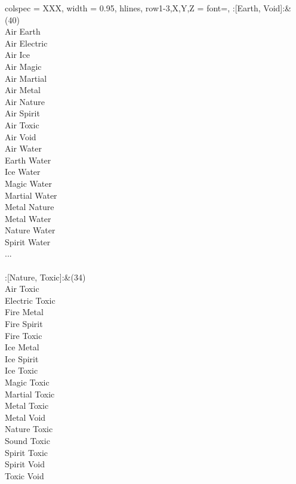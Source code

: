 \begin{longtblr}[
	caption = {2v2 Defending Resisted},
	label = {2v2-Defending-Resisted},
]{
	colspec = {XXX}, width = 0.95\linewidth,
	hlines,
	row{1-3,X,Y,Z} = {font=\bfseries},
}
	:[Earth, Void]:&{(40)\\
	Air Earth \\
	Air Electric \\
	Air Ice \\
	Air Magic \\
	Air Martial \\
	Air Metal \\
	Air Nature \\
	Air Spirit \\
	Air Toxic \\
	Air Void \\
	Air Water \\
	Earth Water \\
	Ice Water \\
	Magic Water \\
	Martial Water \\
	Metal Nature \\
	Metal Water \\
	Nature Water \\
	Spirit Water \\
	...\\
	}\\

	:[Nature, Toxic]:&{(34)\\
	Air Toxic \\
	Electric Toxic \\
	Fire Metal \\
	Fire Spirit \\
	Fire Toxic \\
	Ice Metal \\
	Ice Spirit \\
	Ice Toxic \\
	Magic Toxic \\
	Martial Toxic \\
	Metal Toxic \\
	Metal Void \\
	Nature Toxic \\
	Sound Toxic \\
	Spirit Toxic \\
	Spirit Void \\
	Toxic Void \\
	}\\


\end{longtblr}
